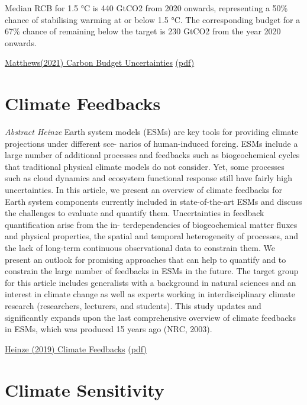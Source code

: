\documentclass[
]{book}
\begin{document}
Median RCB for 1.5 °C is 440 GtCO2 from 2020
onwards, representing a 50\% chance of stabilising warming at or
below 1.5 °C.
The corresponding budget for a 67\% chance of remaining below the target is
230 GtCO2 from the year 2020 onwards.

\href{https://www.nature.com/articles/s43247-020-00064-9}{Matthews(2021) Carbon Budget Uncertainties}
\href{pdf/Matthews_2021_Carbon_Budget_Uncertainties.pdf}{(pdf)}

\hypertarget{climate-feedbacks}{%
\chapter{Climate Feedbacks}\label{climate-feedbacks}}

\emph{Abstract Heinze}
Earth system models (ESMs) are key tools for providing climate projections under different sce-
narios of human-induced forcing. ESMs include a large number of additional processes and feedbacks such as
biogeochemical cycles that traditional physical climate models do not consider. Yet, some processes such as
cloud dynamics and ecosystem functional response still have fairly high uncertainties. In this article, we present
an overview of climate feedbacks for Earth system components currently included in state-of-the-art ESMs and
discuss the challenges to evaluate and quantify them. Uncertainties in feedback quantification arise from the in-
terdependencies of biogeochemical matter fluxes and physical properties, the spatial and temporal heterogeneity
of processes, and the lack of long-term continuous observational data to constrain them. We present an outlook
for promising approaches that can help to quantify and to constrain the large number of feedbacks in ESMs in
the future. The target group for this article includes generalists with a background in natural sciences and an
interest in climate change as well as experts working in interdisciplinary climate research (researchers, lecturers,
and students). This study updates and significantly expands upon the last comprehensive overview of climate
feedbacks in ESMs, which was produced 15 years ago (NRC, 2003).

\href{https://www.researchgate.net/publication/334387499_ESD_Reviews_Climate_feedbacks_in_the_Earth_system_and_prospects_for_their_evaluation}{Heinze (2019) Climate Feedbacks}
\href{pdf/Heinze_2019_Climate_Feedbacks.pdf}{(pdf)}

\hypertarget{climate-sensitivity}{%
\chapter{Climate Sensitivity}\label{climate-sensitivity}}
\end{document}
